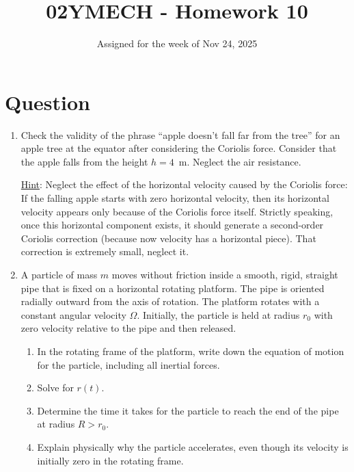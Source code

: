 \documentclass[12pt]{article}
\title{02YMECH - Homework 10}
\date{Assigned for the week of Nov 24, 2025}
\author{}
\begin{document}
\maketitle

\section*{Question}

\begin{enumerate}
    \item Check the validity of the phrase ``apple doesn't fall far from the tree'' for an apple tree at the equator after considering the Coriolis force. Consider that the apple falls from the height $h = 4$~m. Neglect the air resistance.
    
    \underline{Hint}: Neglect the effect of the horizontal velocity caused by the Coriolis force: If the falling apple starts with zero horizontal velocity, then its horizontal velocity appears only because of the Coriolis force itself. Strictly speaking, once this horizontal component exists, it should generate a second-order Coriolis correction (because now velocity has a horizontal piece). That correction is extremely small, neglect it.
    
    \item A particle of mass $m$ moves without friction inside a smooth, rigid, straight pipe that is fixed on a horizontal rotating platform. The pipe is oriented radially outward from the axis of rotation. The platform rotates with a constant angular velocity $\Omega$. Initially, the particle is held at radius $r_0$ with zero velocity relative to the pipe and then released.

\begin{enumerate}
    \item In the rotating frame of the platform, write down the equation of motion for the particle, including all inertial forces.
    \item Solve for $r(t)$.
    \item Determine the time it takes for the particle to reach the end of the pipe at radius $R > r_0$.
    \item Explain physically why the particle accelerates, even though its velocity is initially zero in the rotating frame.
\end{enumerate}
    


\end{enumerate}
\end{document}
